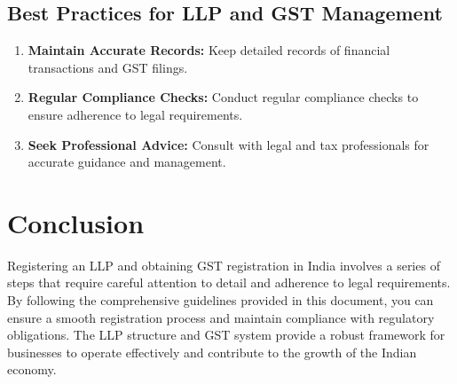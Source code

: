 \documentclass[a4paper,12pt]{report}
\begin{document}
\section{Best Practices for LLP and GST Management}
\begin{enumerate}
    \item \textbf{Maintain Accurate Records:} Keep detailed records of financial transactions and GST filings.
    \item \textbf{Regular Compliance Checks:} Conduct regular compliance checks to ensure adherence to legal requirements.
    \item \textbf{Seek Professional Advice:} Consult with legal and tax professionals for accurate guidance and management.
\end{enumerate}

\chapter{Conclusion}
Registering an LLP and obtaining GST registration in India involves a series of steps that require careful attention to detail and adherence to legal requirements. By following the comprehensive guidelines provided in this document, you can ensure a smooth registration process and maintain compliance with regulatory obligations. The LLP structure and GST system provide a robust framework for businesses to operate effectively and contribute to the growth of the Indian economy.
\end{document}
